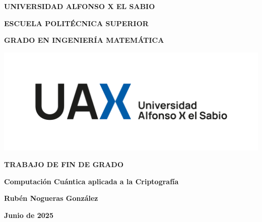 \documentclass{article}
\numberwithin{equation}{section} %
\begin{document}
    \parindent=0pt

    \begin{titlepage}
        \centering
        {\fontsize{18pt}{22pt}\selectfont \textbf{UNIVERSIDAD ALFONSO X EL SABIO}\par}
        \vspace{1cm}
        {\fontsize{16pt}{22pt}\selectfont \textbf{ESCUELA POLITÉCNICA SUPERIOR}\par}
        \vspace{1cm}
        {\fontsize{14pt}{22pt}\selectfont \textbf{GRADO EN INGENIERÍA MATEMÁTICA}\par}
        \vspace{2cm}
        {\includegraphics[width=1\textwidth]{img/portada.png}\par}
        \vspace{0.5cm}
        {\fontsize{20pt}{22pt}\selectfont \textbf{TRABAJO DE FIN DE GRADO}\par}
        \vspace{1cm}
        {\fontsize{14pt}{22pt}\selectfont \textbf{Computación Cuántica aplicada a la Criptografía}\par}
        \vfill
        {\fontsize{14pt}{22pt}\selectfont \textbf{Rubén Nogueras González}\par}
        \vspace{1cm}
        {\fontsize{14pt}{22pt}\selectfont \textbf{Junio de 2025}\par}
    \end{titlepage}
    
    \newpage
    \thispagestyle{empty}
    \mbox{}
    \newpage

    \tableofcontents

    \newpage
    \thispagestyle{empty}
    \mbox{}
    \newpage

    \listoffigures

    \newpage
    \thispagestyle{empty}
    \mbox{}
    \newpage
\end{document}
